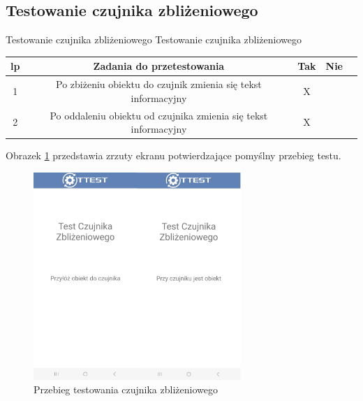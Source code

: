 \newpage


\subsection{Testowanie czujnika zbliżeniowego}

\begin{tabela}
	{Testowanie czujnika zbliżeniowego}	%
	{Testowanie czujnika zbliżeniowego}	%
	{
		\begin{tabular}{|c|c|c|c|c|} \hline
			\textbf{lp} & \textbf{Zadania do przetestowania} & \textbf{Tak} & \textbf{Nie} \\ \hline
			1 & Po zbiżeniu obiektu do czujnik zmienia się tekst informacyjny  & X & ~ \\ \hline
			2 & Po oddaleniu obiektu od czujnika zmienia się tekst informacyjny & X & ~ \\ \hline
	\end{tabular}	}
	\label{tab:tablica_zblizeniowy}
\end{tabela}

Obrazek \ref{rys:zblizeniowy} przedstawia zrzuty ekranu potwierdzające pomyślny przebieg testu.

\begin{figure}[!hbt]
	\begin{center}
		\includegraphics[angle=360, width=0.70\textwidth]{rys/punkt5/zblizeniowy.jpg}
		\caption{Przebieg testowania czujnika zbliżeniowego}
		\label{rys:zblizeniowy}
	\end{center}
\end{figure}   

\newpage


